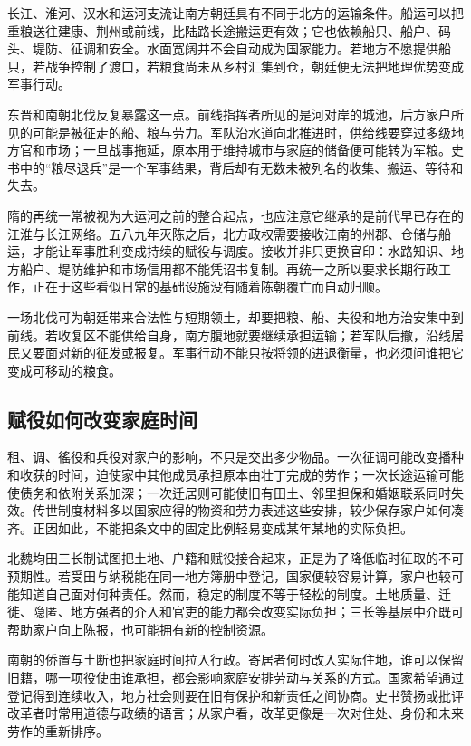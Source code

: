 长江、淮河、汉水和运河支流让南方朝廷具有不同于北方的运输条件。船运可以把重粮送往建康、荆州或前线，比陆路长途搬运更有效；它也依赖船只、船户、码头、堤防、征调和安全。水面宽阔并不会自动成为国家能力。若地方不愿提供船只，若战争控制了渡口，若粮食尚未从乡村汇集到仓，朝廷便无法把地理优势变成军事行动。

东晋和南朝北伐反复暴露这一点。前线指挥者所见的是河对岸的城池，后方家户所见的可能是被征走的船、粮与劳力。军队沿水道向北推进时，供给线要穿过多级地方官和市场；一旦战事拖延，原本用于维持城市与家庭的储备便可能转为军粮。史书中的“粮尽退兵”是一个军事结果，背后却有无数未被列名的收集、搬运、等待和失去。

隋的再统一常被视为大运河之前的整合起点，也应注意它继承的是前代早已存在的江淮与长江网络。五八九年灭陈之后，北方政权需要接收江南的州郡、仓储与船运，才能让军事胜利变成持续的赋役与调度。接收并非只更换官印：水路知识、地方船户、堤防维护和市场信用都不能凭诏书复制。再统一之所以要求长期行政工作，正在于这些看似日常的基础设施没有随着陈朝覆亡而自动归顺。

\begin{turningpoint}
一场北伐可为朝廷带来合法性与短期领土，却要把粮、船、夫役和地方治安集中到前线。若收复区不能供给自身，南方腹地就要继续承担运输；若军队后撤，沿线居民又要面对新的征发或报复。军事行动不能只按将领的进退衡量，也必须问谁把它变成可移动的粮食。
\end{turningpoint}

\subsection{赋役如何改变家庭时间}

租、调、徭役和兵役对家户的影响，不只是交出多少物品。一次征调可能改变播种和收获的时间，迫使家中其他成员承担原本由壮丁完成的劳作；一次长途运输可能使债务和依附关系加深；一次迁居则可能使旧有田土、邻里担保和婚姻联系同时失效。传世制度材料多以国家应得的物资和劳力表述这些安排，较少保存家户如何凑齐。正因如此，不能把条文中的固定比例轻易变成某年某地的实际负担。

北魏均田三长制试图把土地、户籍和赋役接合起来，正是为了降低临时征取的不可预期性。若受田与纳税能在同一地方簿册中登记，国家便较容易计算，家户也较可能知道自己面对何种责任。然而，稳定的制度不等于轻松的制度。土地质量、迁徙、隐匿、地方强者的介入和官吏的能力都会改变实际负担；三长等基层中介既可帮助家户向上陈报，也可能拥有新的控制资源。

南朝的侨置与土断也把家庭时间拉入行政。寄居者何时改入实际住地，谁可以保留旧籍，哪一项役使由谁承担，都会影响家庭安排劳动与关系的方式。国家希望通过登记得到连续收入，地方社会则要在旧有保护和新责任之间协商。史书赞扬或批评改革者时常用道德与政绩的语言；从家户看，改革更像是一次对住处、身份和未来劳作的重新排序。

